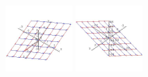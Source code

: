 \documentclass[10pt]{amsart}
\begin{document}
\begin{multicols}{2}
\begin{enumerate}
\includegraphics[height=1in]{support/vs4}
\includegraphics[height=1in]{support/vsr4}




\end{enumerate}
\end{multicols}
\end{document}
